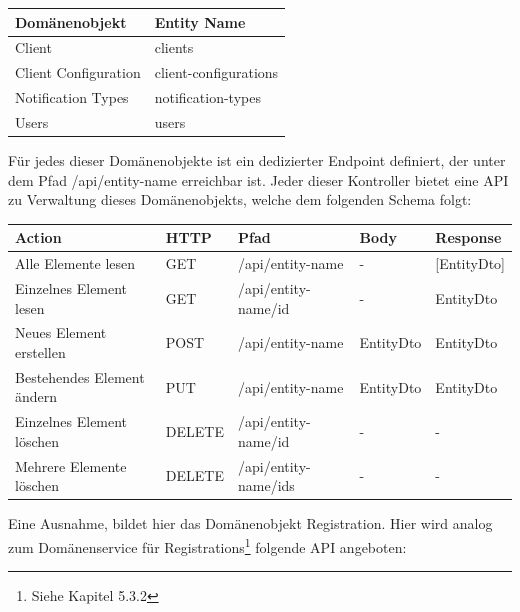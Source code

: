 \begin{tabularx}{\textwidth}{|l|X|}
    \hline
    \textbf{Domänenobjekt} & \textbf{Entity Name}  \\
    \hline
    Client                 & clients               \\
    \hline
    Client Configuration   & client-configurations \\
    \hline
    Notification Types     & notification-types    \\
    \hline
    Users                  & users                 \\
    \hline
\end{tabularx}\label{tab:adminapimethods}

Für jedes dieser Domänenobjekte ist ein dedizierter Endpoint definiert, der unter dem Pfad /api/entity-name erreichbar ist.
Jeder dieser Kontroller bietet eine API zu Verwaltung dieses Domänenobjekts, welche dem folgenden Schema folgt:

\begin{tabularx}{\textwidth}{|p{5cm}|l|l|l|X|}
    \hline
    \textbf{Action}            & \textbf{HTTP} & \textbf{Pfad}        & \textbf{Body} & \textbf{Response} \\
    \hline
    Alle Elemente lesen        & GET           & /api/entity-name     & -             & [EntityDto]       \\
    \hline
    Einzelnes Element lesen    & GET           & /api/entity-name/id  & -             & EntityDto         \\
    \hline
    Neues Element erstellen    & POST          & /api/entity-name     & EntityDto     & EntityDto         \\
    \hline
    Bestehendes Element ändern & PUT           & /api/entity-name     & EntityDto     & EntityDto         \\
    \hline
    Einzelnes Element löschen  & DELETE        & /api/entity-name/id  & -             & -                 \\
    \hline
    Mehrere Elemente löschen   & DELETE        & /api/entity-name/ids & -             & -                 \\
    \hline
\end{tabularx}\label{tab:apimethods}

Eine Ausnahme, bildet hier das Domänenobjekt Registration.
Hier wird analog zum Domänenservice für Registrations\footnote{Siehe Kapitel 5.3.2} folgende API angeboten:

